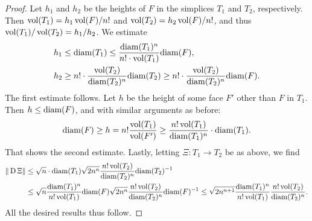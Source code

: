 \documentclass[a4paper]{article}
\begin{document}
\begin{proof}
    Let $h_1$ and $h_2$ be the heights of $F$ in the simplices $T_1$ and $T_2$, respectively. 
    Then $\operatorname{vol}(T_1) = h_1 \operatorname{vol}(F)/n!$ and $\operatorname{vol}(T_2) = h_2 \operatorname{vol}(F)/n!$, and thus $\operatorname{vol}(T_1)/\operatorname{vol}(T_2) = h_1/h_2$.
    We estimate 
    \begin{align*}
        h_1 &\leq {\operatorname{diam}}(T_1) \leq \frac{{\operatorname{diam}}(T_1)^{n}}{n! \cdot \operatorname{vol}(T_1)} {\operatorname{diam}}(F),
        \\
        h_2 &\geq n! \cdot \frac{\operatorname{vol}(T_2)}{{\operatorname{diam}}(T_2)^{n}} {\operatorname{diam}}(T_2) \geq n! \cdot \frac{\operatorname{vol}(T_2)}{{\operatorname{diam}}(T_2)^{n}} {\operatorname{diam}}(F)
        .
    \end{align*}
    The first estimate follows. 
    Let $h$ be the height of some face $F'$ other than $F$ in $T_1$. Then $h \leq {\operatorname{diam}}(F)$, and with similar arguments as before: 
    \begin{align*}
        {\operatorname{diam}}(F)
        \geq 
        h
        =
        n!
        \frac{ \operatorname{vol}(T_1) }{ \operatorname{vol}(F') }
        \geq 
        \frac{ n! \operatorname{vol}(T_1) }{ {\operatorname{diam}}(T_1)^{n} }
        \cdot 
        {\operatorname{diam}}(T_1)
        .
    \end{align*}
    That shows the second estimate. 
    Lastly, letting $\Xi : T_1 \rightarrow T_2$ be as above, we find 
    \begin{align*}
        \| \operatorname{D} \Xi \|
        &
        \leq 
        \sqrt{n} 
        \cdot 
        {\operatorname{diam}}(T_1)
        \sqrt{2n^{n}} 
        \frac{ n! \operatorname{vol}(T_2) } {{\operatorname{diam}}(T_2)^{n} } 
        {\operatorname{diam}}(T_2)^{-1}
        \\&
        \leq 
        \sqrt{n} 
        \frac{ {\operatorname{diam}}(T_1)^{n} }{ n! \operatorname{vol}(T_1) }
        {\operatorname{diam}}(F)
        \sqrt{2n^{n}} \frac{ n! \operatorname{vol}(T_2) } { {\operatorname{diam}}(T_2)^{n} } 
        {\operatorname{diam}}(F)^{-1}
        \leq 
        \sqrt{2n^{n+1}}
        \frac{ {\operatorname{diam}}(T_1)^{n} }{ n! \operatorname{vol}(T_1) }
        \frac{ n! \operatorname{vol}(T_2) } { {\operatorname{diam}}(T_2)^{n} } 
        .
    \end{align*}
    All the desired results thus follow. 
\end{proof}
\end{document}
